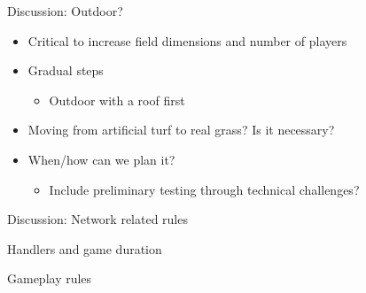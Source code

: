 \documentclass[xcolor=dvipsnames]{beamer}
\begin{document}
\begin{frame}{Discussion: Outdoor?}
  \begin{itemize}
  \item Critical to increase field dimensions and number of players
  \item Gradual steps
    \begin{itemize}
    \item Outdoor with a roof first
    \end{itemize}
  \item Moving from artificial turf to real grass? Is it necessary?
  \item When/how can we plan it? 
    \begin{itemize}
    \item Include preliminary testing through technical challenges?
    \end{itemize}
  \end{itemize}
\end{frame}

\begin{frame}{Discussion: Network related rules}
\end{frame}

\begin{frame}{Handlers and game duration}
\end{frame}

\begin{frame}{Gameplay rules}
\end{frame}
\end{document}
